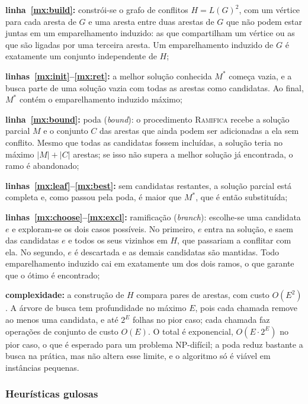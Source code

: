 \begin{alineas}
    \item \textbf{linha~\ref{mx:build}:} constrói-se o grafo de conflitos $H = L(G)^2$, com um vértice para cada aresta de $G$ e uma aresta entre duas arestas de $G$ que não podem estar juntas em um emparelhamento induzido: as que compartilham um vértice ou as que são ligadas por uma terceira aresta. Um emparelhamento induzido de $G$ é exatamente um conjunto independente de $H$;
    \item \textbf{linhas~\ref{mx:init}--\ref{mx:ret}:} a melhor solução conhecida $M^*$ começa vazia, e a busca parte de uma solução vazia com todas as arestas como candidatas. Ao final, $M^*$ contém o emparelhamento induzido máximo;
    \item \textbf{linha~\ref{mx:bound}:} poda (\textit{bound}): o procedimento \textsc{Ramifica} recebe a solução parcial $M$ e o conjunto $C$ das arestas que ainda podem ser adicionadas a ela sem conflito. Mesmo que todas as candidatas fossem incluídas, a solução teria no máximo $|M| + |C|$ arestas; se isso não supera a melhor solução já encontrada, o ramo é abandonado;
    \item \textbf{linhas~\ref{mx:leaf}--\ref{mx:best}:} sem candidatas restantes, a solução parcial está completa e, como passou pela poda, é maior que $M^*$, que é então substituída;
    \item \textbf{linhas~\ref{mx:choose}--\ref{mx:excl}:} ramificação (\textit{branch}): escolhe-se uma candidata $e$ e exploram-se os dois casos possíveis. No primeiro, $e$ entra na solução, e saem das candidatas $e$ e todos os seus vizinhos em $H$, que passariam a conflitar com ela. No segundo, $e$ é descartada e as demais candidatas são mantidas. Todo emparelhamento induzido cai em exatamente um dos dois ramos, o que garante que o ótimo é encontrado;
    \item \textbf{complexidade:} a construção de $H$ compara pares de arestas, com custo $O(E^2)$. A árvore de busca tem profundidade no máximo $E$, pois cada chamada remove ao menos uma candidata, e até $2^E$ folhas no pior caso; cada chamada faz operações de conjunto de custo $O(E)$. O total é exponencial, $O(E \cdot 2^E)$ no pior caso, o que é esperado para um problema NP-difícil; a poda reduz bastante a busca na prática, mas não altera esse limite, e o algoritmo só é viável em instâncias pequenas.
\end{alineas}

\subsubsection{Heurísticas gulosas}

